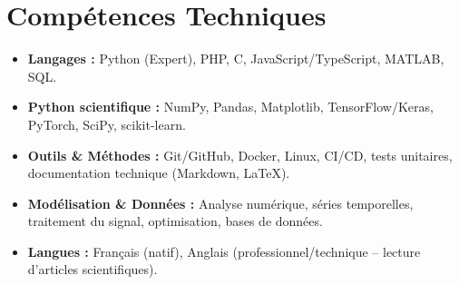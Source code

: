 \documentclass[a4paper,11pt]{article}
\begin{document}
\section{Compétences Techniques}
\begin{itemize}[leftmargin=*, nosep]
    \item \small{\textbf{Langages :} Python (Expert), PHP, C, JavaScript/TypeScript, MATLAB, SQL.}
    \item \small{\textbf{Python scientifique :} NumPy, Pandas, Matplotlib, TensorFlow/Keras, PyTorch, SciPy, scikit-learn.}
    \item \small{\textbf{Outils \& Méthodes :} Git/GitHub, Docker, Linux, CI/CD, tests unitaires, documentation technique (Markdown, LaTeX).}
    \item \small{\textbf{Modélisation \& Données :} Analyse numérique, séries temporelles, traitement du signal, optimisation, bases de données.}
    \item \small{\textbf{Langues :} Français (natif), Anglais (professionnel/technique -- lecture d'articles scientifiques).}
\end{itemize}

\end{document}
